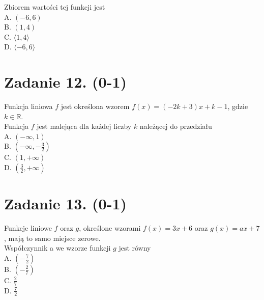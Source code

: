 \documentclass[10pt]{article}
\begin{document}
Zbiorem wartości tej funkcji jest\\
A. \((-6,6)\)\\
B. \((1,4)\)\\
C. \(\langle 1,4\rangle\)\\
D. \(\langle-6,6\rangle\)

\section*{Zadanie 12. (0-1)}
Funkcja liniowa \(f\) jest określona wzorem \(f(x)=(-2 k+3) x+k-1\), gdzie \(k \in \mathbb{R}\).\\
Funkcja \(f\) jest malejąca dla każdej liczby \(k\) należącej do przedziału\\
A. \((-\infty, 1)\)\\
B. \(\left(-\infty,-\frac{3}{2}\right)\)\\
C. \((1,+\infty)\)\\
D. \(\left(\frac{3}{2},+\infty\right)\)

\section*{Zadanie 13. (0-1)}
Funkcje liniowe \(f\) oraz \(g\), określone wzorami \(f(x)=3 x+6\) oraz \(g(x)=a x+7\), mają to samo miejsce zerowe.\\
Współczynnik a we wzorze funkcji \(g\) jest równy\\
A. \(\left(-\frac{7}{2}\right)\)\\
B. \(\left(-\frac{2}{7}\right)\)\\
C. \(\frac{2}{7}\)\\
D. \(\frac{7}{2}\)
\end{document}
